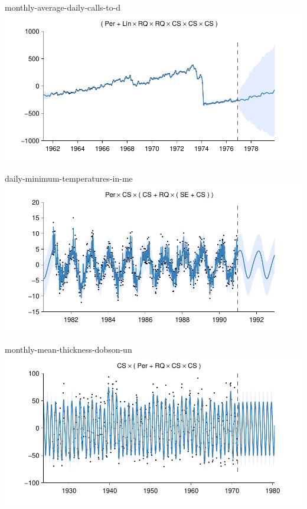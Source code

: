\begin{frame}{monthly-average-daily-calls-to-d}
  \center
  \includegraphics[width=1.0\textwidth]{figures/monthly-average-daily-calls-to-d/monthly-average-daily-calls-to-d_all}
\end{frame}  

\begin{frame}{daily-minimum-temperatures-in-me}
  \center
  \includegraphics[width=1.0\textwidth]{figures/daily-minimum-temperatures-in-me/daily-minimum-temperatures-in-me_all}
\end{frame}

\begin{frame}{monthly-mean-thickness-dobson-un}
  \center
  \includegraphics[width=1.0\textwidth]{figures/monthly-mean-thickness-dobson-un/monthly-mean-thickness-dobson-un_all}
\end{frame}  

